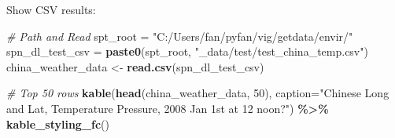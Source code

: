 \documentclass[
]{book}
\newenvironment{Shaded}{\begin{snugshade}}{\end{snugshade}}
\newcommand{\CommentTok}[1]{\textcolor[rgb]{0.56,0.35,0.01}{\textit{#1}}}
\newcommand{\DataTypeTok}[1]{\textcolor[rgb]{0.13,0.29,0.53}{#1}}
\newcommand{\DecValTok}[1]{\textcolor[rgb]{0.00,0.00,0.81}{#1}}
\newcommand{\KeywordTok}[1]{\textcolor[rgb]{0.13,0.29,0.53}{\textbf{#1}}}
\newcommand{\NormalTok}[1]{#1}
\newcommand{\OperatorTok}[1]{\textcolor[rgb]{0.81,0.36,0.00}{\textbf{#1}}}
\newcommand{\StringTok}[1]{\textcolor[rgb]{0.31,0.60,0.02}{#1}}
\begin{document}
Show CSV results:

\begin{Shaded}
\begin{Highlighting}[]
\CommentTok{\# Path and Read}
\NormalTok{spt\_root =}\StringTok{ "C:/Users/fan/pyfan/vig/getdata/envir/"}
\NormalTok{spn\_dl\_test\_csv =}\StringTok{ }\KeywordTok{paste0}\NormalTok{(spt\_root, }\StringTok{"\_data/test/test\_china\_temp.csv"}\NormalTok{)}
\NormalTok{china\_weather\_data \textless{}{-}}\StringTok{ }\KeywordTok{read.csv}\NormalTok{(spn\_dl\_test\_csv)}

\CommentTok{\# Top 50 rows}
\KeywordTok{kable}\NormalTok{(}\KeywordTok{head}\NormalTok{(china\_weather\_data, }\DecValTok{50}\NormalTok{), }
      \DataTypeTok{caption=}\StringTok{"Chinese Long and Lat, Temperature Pressure, 2008 Jan 1st at 12 noon?"}\NormalTok{) }\OperatorTok{\%\textgreater{}\%}
\StringTok{  }\KeywordTok{kable\_styling\_fc}\NormalTok{()}
\end{Highlighting}
\end{Shaded}
\end{document}
